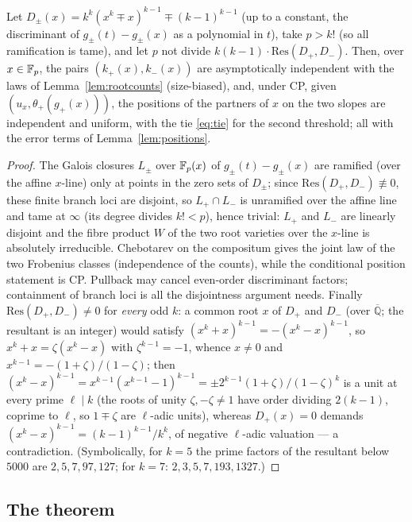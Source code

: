 \begin{lemma}\label{lem:twoslopes}
Let $D_\pm(x)=k^k(x^k\mp x)^{k-1}\mp(k-1)^{k-1}$ (up to a constant, the discriminant of $g_\pm(t)-g_\pm(x)$ as a polynomial in $t$), take $p>k!$ (so all ramification is tame), and let $p$ not
divide $k(k-1)\cdot\mathrm{Res}(D_+,D_-)$.  Then, over $x\in\mathbb{F}_p$, the pairs $(k_+(x),k_-(x))$ are asymptotically independent with the laws of
Lemma~\ref{lem:rootcounts} (size-biased), and, under CP, given $(u_x,\theta_+(g_+(x)))$, the positions of the partners of $x$ on the two slopes are independent and
uniform, with the tie \eqref{eq:tie} for the second threshold; all with the error terms of Lemma~\ref{lem:positions}.
\end{lemma}
\begin{proof}
The Galois closures $L_\pm$ over $\mathbb{F}_p(x)$ of $g_\pm(t)-g_\pm(x)$ are ramified (over the affine $x$-line) only at points in the zero sets of $D_\pm$; since
$\mathrm{Res}(D_+,D_-)\not\equiv0$, these finite branch loci are disjoint, so $L_+\cap L_-$ is unramified over the affine line and tame at $\infty$
(its degree divides $k!<p$), hence trivial: $L_+$ and $L_-$ are linearly disjoint and the fibre product $W$ of the two root varieties over the $x$-line is
absolutely irreducible.  Chebotarev on the compositum gives the joint law of the two Frobenius classes (independence of the counts), while the conditional position statement is CP.  Pullback may cancel even-order discriminant factors; containment of branch loci is all the disjointness argument needs.
Finally $\mathrm{Res}(D_+,D_-)\ne0$ for \emph{every} odd $k$: a common root $x$ of $D_+$ and $D_-$ (over $\overline{\mathbb Q}$; the
resultant is an integer) would satisfy $(x^k+x)^{k-1}=-(x^k-x)^{k-1}$, so $x^k+x=\zeta(x^k-x)$ with $\zeta^{k-1}=-1$, whence $x\ne0$ and
$x^{k-1}=-(1+\zeta)/(1-\zeta)$; then $(x^k-x)^{k-1}=x^{k-1}(x^{k-1}-1)^{k-1}=\pm2^{k-1}(1+\zeta)/(1-\zeta)^{k}$ is a unit at every prime $\ell\mid k$
(the roots of unity $\zeta,-\zeta\ne1$ have order dividing $2(k-1)$, coprime to $\ell$, so $1\mp\zeta$ are $\ell$-adic units), whereas $D_+(x)=0$
demands $(x^k-x)^{k-1}=(k-1)^{k-1}/k^k$, of negative $\ell$-adic valuation — a contradiction.  (Symbolically, for $k=5$ the prime factors of the
resultant below $5000$ are $2,5,7,97,127$; for $k=7$: $2,3,5,7,193,1327$.)
\end{proof}

\subsection*{The theorem}


